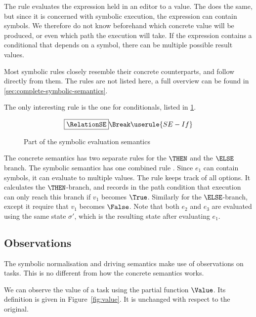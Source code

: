 The  rule evaluates the expression held in an editor to a value.
The  does the same, but since it is concerned with symbolic execution, the expression can contain symbols.
We therefore do not know beforehand which concrete value will be produced, or even which path the execution will take.
If the expression contains a conditional that depends on a symbol, there can be multiple possible result values.


Most symbolic rules closely resemble their concrete counterparts, and follow directly from them.
The rules are not listed here, a full overview can be found in \cref{sec:complete-symbolic-semantics}.

The only interesting rule is the one for conditionals, listed in \cref{fig:eval}.
\begin{figure}[h]
  \small
  \begin{gather*}
    \boxed{\RelationSE} \Break
    \userule{SE-If}
  \end{gather*}
  \caption{Part of the symbolic evaluation semantics}
  \label{fig:eval}
\end{figure}
The concrete semantics has two separate rules for the $\THEN$ and the $\ELSE$ branch.
The symbolic semantics has one combined rule .
Since $e_1$ can contain symbols, it can evaluate to multiple values.
The rule keeps track of all options.
It calculates the $\THEN$-branch, and records in the path condition that execution can only reach this branch if $v_1$ becomes $\True$.
Similarly for the $\ELSE$-branch, except it require that $v_1$ becomes $\False$.
Note that both $e_2$ and $e_3$ are evaluated using the same state $\sigma'$,
which is the resulting state after evaluating $e_1$.



\subsection{Observations}
\label{subsec:observations}

The symbolic normalisation and driving semantics make use of observations on tasks.
This is no different from how the concrete \TOPHAT semantics works.

We can observe the value of a task using the partial function $\Value$.
Its definition is given in Figure~\ref{fig:value}.
It is unchanged with respect to the original.

